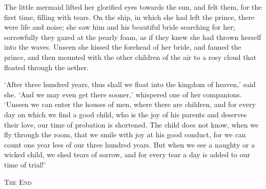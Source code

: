 The little mermaid lifted her glorified eyes towards the sun, and felt them, for the first time, filling with tears.
On the ship, in which she had left the prince, there were life and noise; she saw him and his beautiful bride searching for her; sorrowfully they gazed at the pearly foam, as if they knew she had thrown herself into the waves.
Unseen she kissed the forehead of her bride, and fanned the prince, and then mounted with the other children of the air to a rosy cloud that floated through the aether.

`After three hundred years, thus shall we float into the kingdom of heaven,' said she.
`And we may even get there sooner,' whispered one of her companions.
`Unseen we can enter the houses of men, where there are children, and for every day on which we find a good child, who is the joy of his parents and deserves their love, our time of probation is shortened.
The child does not know, when we fly through the room, that we smile with joy at his good conduct, for we can count one year less of our three hundred years.
But when we see a naughty or a wicked child, we shed tears of sorrow, and for every tear a day is added to our time of trial!' 

\begin{center}
    \textsc{The End}
\end{center}